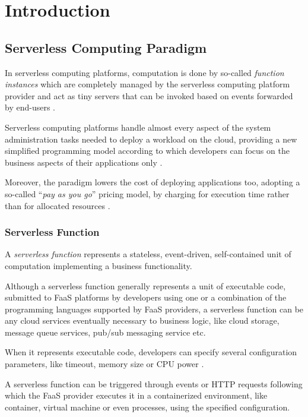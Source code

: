 \documentclass[12pt,a4paper]{report}
\theoremstyle{definition}
\begin{document}
	
\tableofcontents

\chapter{Introduction}







\section{Serverless Computing Paradigm}

In serverless computing platforms, computation is done by so-called \textit{function instances} which are completely managed by the serverless computing platform provider and act as tiny servers that can be invoked based on events forwarded by end-users \cite{PMSCP}.

Serverless computing platforms handle almost every aspect of the system administration tasks needed to deploy a workload on the cloud, providing a new simplified programming model according to which developers can focus on the business aspects of their applications only \cite{COSE}.

Moreover, the paradigm lowers the cost of deploying applications too, adopting a so-called “\textit{pay as you go}” pricing model, by charging for execution time rather than for allocated resources \cite{COSE}.


\subsection{Serverless Function}

A \textit{serverless function} represents a stateless, event-driven, self-contained unit of computation implementing a business functionality.

Although a serverless function generally represents a unit of executable code, submitted to FaaS platforms by developers using one or a combination of the programming languages supported by FaaS providers, a serverless function can be any cloud services eventually necessary to business logic, like cloud storage, message queue services, pub/sub messaging service etc.

When it represents executable code, developers can specify several configuration parameters, like timeout, memory size or CPU power \cite{COSE}.

A serverless function can be triggered through events or HTTP requests following which the FaaS provider executes it in a containerized environment, like container, virtual machine or even processes, using the specified configuration.
\end{document}
